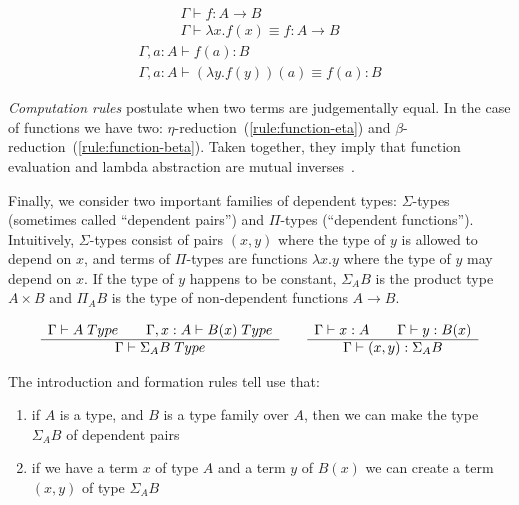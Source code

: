 \begin{equation}
  \begin{array}{c}
    \Gamma \vdash f : A \rightarrow B\\
    \hline
    \Gamma \vdash \lambda x. f(x) \equiv f : A \rightarrow B
  \end{array}
  \label{rule:function-eta}
\end{equation}
\begin{equation}
  \begin{array}{c}
    \Gamma, a : A \vdash f(a) : B\\
    \hline
    \Gamma, a : A \vdash (\lambda y . f(y))(a) \equiv f(a) : B
  \end{array}
  \label{rule:function-beta}
\end{equation}

\emph{Computation rules} postulate when two terms are judgementally equal. In
the case of functions we have two: $\eta$-reduction~(\ref{rule:function-eta})
and $\beta$-reduction~(\ref{rule:function-beta}). Taken together, they imply that
function evaluation and lambda abstraction are mutual inverses~\cite{Rijke2019}.

Finally, we consider two important families of dependent types: $\Sigma$-types
(sometimes called ``dependent pairs'') and $\Pi$-types (``dependent
functions''). Intuitively, $\Sigma$-types consist of pairs $(x,y)$ where the
type of $y$ is allowed to depend on $x$, and terms of $\Pi$-types are functions
$\lambda x . y$ where the type of $y$ may depend on $x$. If the type of $y$
happens to be constant, $\Sigma_A B$ is the product type $A \times B$ and
$\Pi_A B$ is the type of non-dependent functions $A \rightarrow B$.

\begin{equation*}
  \begin{array}[t]{c}
    \Gamma \vdash A \; Type \qquad \Gamma, x:A \vdash B(x) \; Type\\
    \hline
    \Gamma \vdash \Sigma_A B \; Type\\
  \end{array}
  \qquad
  \begin{array}[t]{c}
    \Gamma \vdash x:A \qquad \Gamma \vdash y : B(x)\\
    \hline
    \Gamma \vdash (x , y) : \Sigma_A B
  \end{array}
\end{equation*}

The introduction and formation rules tell use that: 
\begin{enumerate}
\item if $A$ is a type, and $B$ is a type family over $A$,
  then we can make the type $\Sigma_A B$ of dependent pairs
\item if we have a term $x$ of type $A$ and a term $y$ of $B(x)$ we can create
    a term $(x,y)$ of type $\Sigma_A B$
\end{enumerate}

